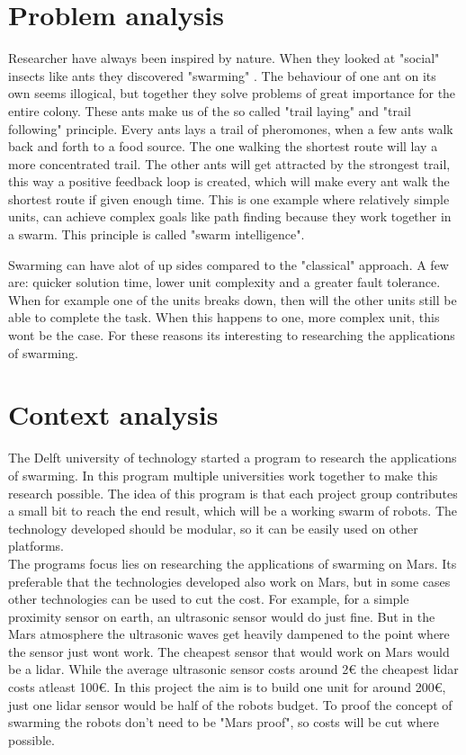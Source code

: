 \section{Problem analysis}
Researcher have always been inspired by nature. When they looked at "social" insects like ants they discovered "swarming"\cite{swarmwiki} . The behaviour of one ant on its own seems illogical, but together they solve problems of great importance for the entire colony. These ants make us of the so called "trail laying" and "trail following" principle. Every ants lays a trail of pheromones, when a few ants walk back and forth to a food source. The one walking the shortest route will lay a more concentrated trail. The other ants will get attracted by the strongest trail, this way a positive feedback loop is created, which will make every ant walk the shortest route if given enough time. This is one example where relatively simple units, can achieve complex goals like path finding because they work together in a swarm. This principle is called "swarm intelligence"\cite{swarmintelligence}.

Swarming can have alot of up sides compared to the "classical" approach. A few are: quicker solution time, lower unit complexity and a greater fault tolerance\cite{swarmintelligence}. When for example one of the units breaks down, then will the other units still be able to complete the task. When this happens to one, more complex unit, this wont be the case. For these reasons its interesting to researching the applications of swarming.



\section{Context analysis}
The Delft university of technology started a program to research the applications of swarming. In this program multiple universities work together to make this research possible. The idea of this program is that each project group contributes a small bit to reach the end result, which will be a working swarm of robots. The technology developed should be modular, so it can be easily used on other platforms.\\The programs focus lies on researching the applications of swarming on Mars. Its preferable that the technologies developed also work on Mars, but in some cases other technologies can be used to cut the cost. For example, for a simple proximity sensor on earth, an ultrasonic sensor would do just fine. But in the Mars atmosphere the ultrasonic waves get heavily dampened to the point where the sensor just wont work\cite{soundonmars}. The cheapest sensor that would work on Mars would be a lidar\cite{lidarmars}. While the average ultrasonic sensor costs around 2$\euro$ the cheapest lidar costs atleast 100$\euro$. In this project the aim is to build one unit for around 200$\euro$, just one lidar sensor would be half of the robots budget. To proof the concept of swarming the robots don't need to be "Mars proof", so costs will be cut where possible.\\

